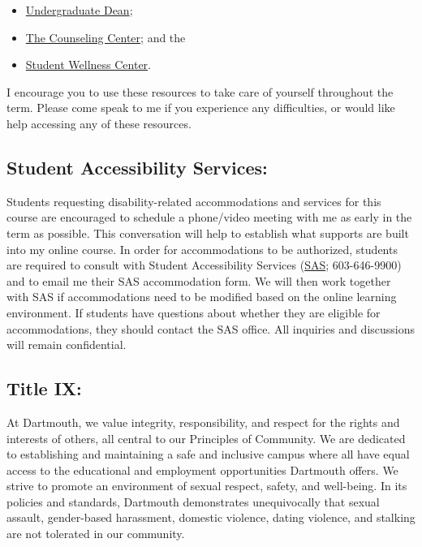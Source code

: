 \documentclass[11pt,letterpaper]{article}
\begin{document}
\begin{itemize}
\item \href{https://students.dartmouth.edu/undergraduate-deans/}{Undergraduate Dean};
\item \href{https://students.dartmouth.edu/health-service/counseling/about}{The Counseling Center}; and the
\item \href{https://students.dartmouth.edu/wellness-center/}{Student Wellness Center}.
\end{itemize}

I encourage you to use these resources to take care of yourself throughout the term. Please come speak to me if you experience any difficulties, or would like help accessing any of these resources.

\subsection*{Student Accessibility Services:}

Students requesting disability-related accommodations and services for this course are encouraged to schedule a phone/video meeting with me as early in the term as possible. This conversation will help to establish what supports are built into my online course. In order for accommodations to be authorized, students are required to consult with Student Accessibility Services (\href{https://www.juliettebruce.xyz/teaching/student.accessibility.services@dartmouth.edu}{SAS}; 603-646-9900) and to email me their SAS accommodation form. We will then work together with SAS if accommodations need to be modified based on the online learning environment. If students have questions about whether they are eligible for accommodations, they should contact the SAS office. All inquiries and discussions will remain confidential.

\subsection*{Title IX:}

At Dartmouth, we value integrity, responsibility, and respect for the rights and interests of others, all central to our Principles of Community. We are dedicated to establishing and maintaining a safe and inclusive campus where all have equal access to the educational and employment opportunities Dartmouth offers. We strive to promote an environment of sexual respect, safety, and well-being. In its policies and standards, Dartmouth demonstrates unequivocally that sexual assault, gender-based harassment, domestic violence, dating violence, and stalking are not tolerated in our community.
\end{document}
